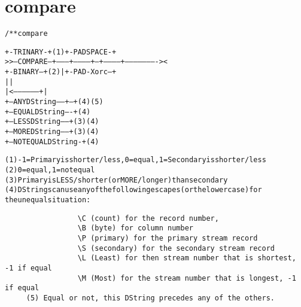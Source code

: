\section{compare}
\begin{shaded}
\begin{alltt}
/** compare

               +-TRINARY-+  (1)           +-PAD SPACE-+
  >>--COMPARE--+---------+------------+---+-----------+----------------------><
               +-BINARY--+  (2)       |   +-PAD-Xorc--+
               |                      |
               | <-----------------+  |
               +--ANY DString------+--+   (4) (5)
               +--EQUAL DString----+      (4)
               +--LESS DString-----+  (3) (4)
               +--MORE DString-----+  (3) (4)
               +--NOTEQUAL DString-+      (4)

     (1) -1 = Primary is shorter/less, 0 = equal, 1 = Secondary is shorter/less
     (2) 0 = equal, 1 = not equal
     (3) Primary is LESS/shorter (or MORE/longer) than secondary
     (4) DStrings can use any of the following escapes (or the lowercase) for
         the unequal situation:
\begin{verbatim}
                 \C (count) for the record number,
                 \B (byte) for column number
                 \P (primary) for the primary stream record
                 \S (secondary) for the secondary stream record
                 \L (Least) for then stream number that is shortest, -1 if equal
                 \M (Most) for the stream number that is longest, -1 if equal
     (5) Equal or not, this DString precedes any of the others.
\end{verbatim}
\end{alltt}
\end{shaded}
